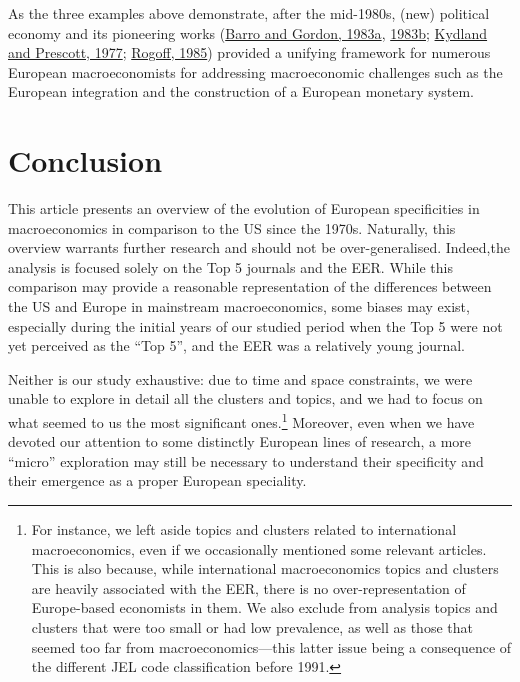 \documentclass[
  12pt,
  onecolumn]{article}
\begin{document}
As the three examples above demonstrate, after the mid-1980s, (new)
political economy and its pioneering works
(\protect\hyperlink{ref-barro1983}{Barro and Gordon, 1983a},
\protect\hyperlink{ref-barro1983c}{1983b};
\protect\hyperlink{ref-kydland1977}{Kydland and Prescott, 1977};
\protect\hyperlink{ref-rogoff1985b}{Rogoff, 1985}) provided a unifying
framework for numerous European macroeconomists for addressing
macroeconomic challenges such as the European integration and the
construction of a European monetary system.

\hypertarget{conclusion}{%
\section*{Conclusion}\label{conclusion}}

This article presents an overview of the evolution of European
specificities in macroeconomics in comparison to the US since the 1970s.
Naturally, this overview warrants further research and should not be
over-generalised. Indeed,the analysis is focused solely on the Top 5
journals and the EER. While this comparison may provide a reasonable
representation of the differences between the US and Europe in
mainstream macroeconomics, some biases may exist, especially during the
initial years of our studied period when the Top 5 were not yet
perceived as the ``Top 5'', and the EER was a relatively young journal.

Neither is our study exhaustive: due to time and space constraints, we
were unable to explore in detail all the clusters and topics, and we had
to focus on what seemed to us the most significant ones.\footnote{For
  instance, we left aside topics and clusters related to international
  macroeconomics, even if we occasionally mentioned some relevant
  articles. This is also because, while international macroeconomics
  topics and clusters are heavily associated with the EER, there is no
  over-representation of Europe-based economists in them. We also
  exclude from analysis topics and clusters that were too small or had
  low prevalence, as well as those that seemed too far from
  macroeconomics---this latter issue being a consequence of the
  different JEL code classification before 1991.} Moreover, even when we
have devoted our attention to some distinctly European lines of
research, a more ``micro'' exploration may still be necessary to
understand their specificity and their emergence as a proper European
speciality.
\end{document}
